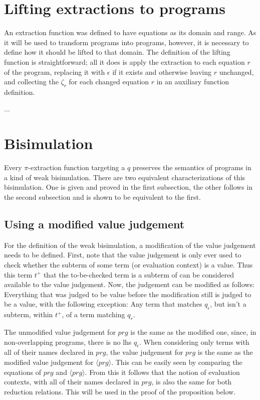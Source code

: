 \section{Lifting extractions to programs}

An extraction function was defined to have equations as its domain and range. As it will be used to transform programs into programs, however, it is necessary to define how it should be lifted to that domain. The definition of the lifting function is straightforward; all it does is apply the extraction to each equation $r$ of the program, replacing it with $\epsilon$ if it exists and otherwise leaving $r$ unchanged, and collecting the $\zeta_r$ for each changed equation $r$ in an auxiliary function definition.

...

\section{Bisimulation}

Every $\pi$-extraction function targeting a $q$ preserves the semantics of programs in a kind of weak bisimulation. There are two equivalent characterizations of this bisimulation. One is given and proved in the first subsection, the other follows in the second subsection and is shown to be equivalent to the first.

\subsection{Using a modified value judgement}

For the definition of the weak bisimulation, a modification of the value judgement needs to be defined. First, note that the value judgement is only ever used to check whether the subterm of some term (or evaluation context) is a value. Thus this term $t^+$ that the to-be-checked term is a subterm of can be considered available to the value judgement. Now, the judgement can be modified as follows: Everything that was judged to be value before the modification still is judged to be a value, with the following exception: Any term that matches $q_\epsilon$, but isn't a subterm, within $t^+$, of a term matching $q_r$.

The unmodified value judgement for $prg$ is the same as the modified one, since, in non-overlapping programs, there is no lhs $q_\epsilon$. When considering only terms with all of their names declared in $prg$, the value judgement for $prg$ is the same as the modified value judgement for $\langle prg \rangle$. This can be easily seen by comparing the equations of $prg$ and $\langle prg \rangle$. From this it follows that the notion of evaluation contexts, with all of their names declared in $prg$, is also the same for both reduction relations. This will be used in the proof of the proposition below.

